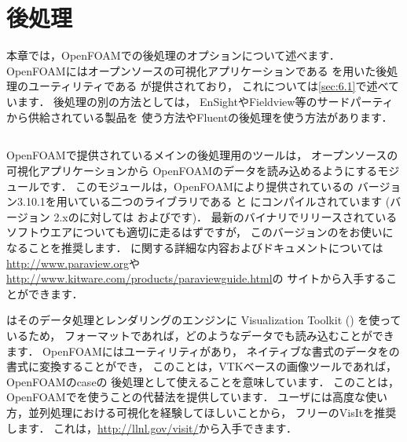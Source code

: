\chapter{後処理}
\label{chap:6}
%
本章では，OpenFOAMでの後処理のオプションについて述べます．
OpenFOAMにはオープンソースの可視化アプリケーションである
を用いた後処理のユーティリティである
が提供されており，
これについては\autoref{sec:6.1}で述べています．
後処理の別の方法としては，
EnSightやFieldview等のサードパーティから供給されている製品を
使う方法やFluentの後処理を使う方法があります．



\section{}
\label{sec:6.1}
%
%
%
%
%
%
OpenFOAMで提供されているメインの後処理用のツールは，
オープンソースの可視化アプリケーションから
OpenFOAMのデータを読み込めるようにするモジュールです．
このモジュールは，OpenFOAMにより提供されているの
バージョン3.10.1を用いている二つのライブラリである
%
%
と
%
%
にコンパイルされています (バージョン
2.xのに対しては
およびです)．
最新のバイナリでリリースされているソフトウエアについても適切に走るはずですが，
このバージョンのをお使いになることを推奨します．
に関する詳細な内容およびドキュメントについては
\url{http://www.paraview.org}や
\url{http://www.kitware.com/products/paraviewguide.html}の
サイトから入手することができます．

はそのデータ処理とレンダリングのエンジンに
Visualization Toolkit () を使っているため，
フォーマットであれば，どのようなデータでも読み込むことができます．
OpenFOAMにはユーティリティがあり，
ネイティブな書式のデータをの書式に変換することができ，
このことは，VTKベースの画像ツールであれば，OpenFOAMのcaseの
後処理として使えることを意味しています．
このことは，OpenFOAMでを使うことの代替法を提供しています．
ユーザには高度な使い方，並列処理における可視化を経験してほしいことから，
フリーのVisItを推奨します．
これは，\url{http://llnl.gov/visit/}から入手できます．

